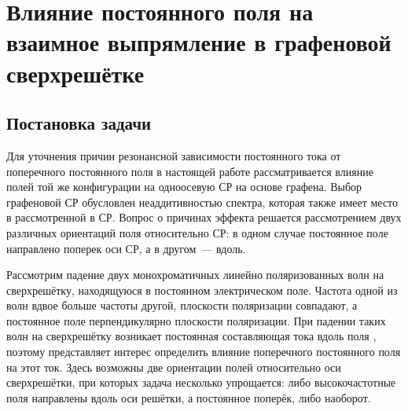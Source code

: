 \section{Влияние постоянного поля на взаимное выпрямление в графеновой сверхрешётке}
\subsection{Постановка задачи}
Для уточнения причин резонансной зависимости постоянного тока от поперечного постоянного поля в настоящей работе рассматривается влияние полей той же конфигурации на одноосевую СР на основе графена. Выбор графеновой СР обусловлен неаддитивностью спектра, которая также имеет место в рассмотренной в \cite{two-axis-sl} СР. Вопрос о причинах эффекта решается рассмотрением двух различных ориентаций поля относительно СР: в одном случае постоянное поле направлено поперек оси СР, а в другом~--- вдоль.

Рассмотрим падение двух монохроматичных линейно поляризованных волн на сверхрешётку, находящуюся в постоянном электрическом поле. Частота одной из волн вдвое больше частоты другой, плоскости поляризации совпадают, а постоянное поле перпендикулярно плоскости поляризации. При падении таких волн на сверхрешётку возникает постоянная составляющая тока вдоль поля \cite{mensah}, поэтому представляет интерес определить влияние поперечного постоянного поля на этот ток. Здесь возможны две ориентации полей относительно оси сверхрешётки, при которых задача несколько упрощается: либо высокочастотные поля направлены вдоль оси решётки, а постоянное поперёк, либо наоборот.


